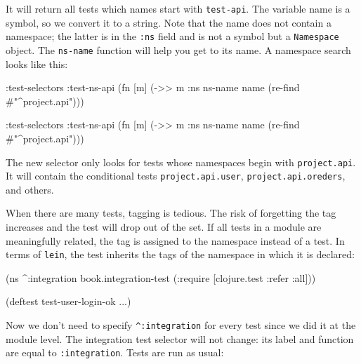 It will return all tests which names start with \verb|test-api|. The variable name is a symbol, so we convert it to a string. Note that the name does not contain a namespace; the latter is in the \verb|:ns| field and is not a symbol but a \verb|Namespace| object. The \verb|ns-name| function will help you get to its name. A namespace search looks like this:


\ifnarrow

\begin{english}
  \begin{clojure}
:test-selectors
  {:test-ns-api
   (fn [m]
     (->> m :ns ns-name name
          (re-find #"^project.api")))}
  \end{clojure}
\end{english}

\else

\begin{english}
  \begin{clojure}
:test-selectors {:test-ns-api
                 (fn [m] (->> m :ns ns-name name
                              (re-find #"^project.api")))}
  \end{clojure}
\end{english}

\fi

The new selector only looks for tests whose namespaces begin with \verb|project.api|. It will contain the conditional tests \verb|project.api.user|, \verb|project.api.oreders|, and others.

When there are many tests, tagging is tedious. The risk of forgetting the tag increases and the test will drop out of the set. If all tests in a module are meaningfully related, the tag is assigned to the namespace instead of a test. In terms of \verb|lein|, the test inherits the tags of the namespace in which it is declared:

\begin{english}
  \begin{clojure}
(ns ^:integration
  book.integration-test
  (:require [clojure.test :refer :all]))

(deftest test-user-login-ok
  ...)
  \end{clojure}
\end{english}

Now we don't need to specify \verb|^:integration| for every test since we did it at the module level. The integration test selector will not change: its label and function are equal to \verb|:integration|. Tests are run as usual:

